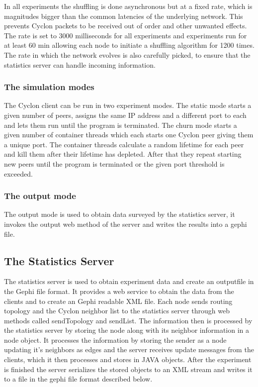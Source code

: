 In all experiments the shuffling is done asynchronous but at a fixed rate, which
is magnitudes bigger than the common latencies of the underlying network. This prevents Cyclon packets to
be received out of order and other unwanted effects. The rate is set to
3000 milliseconds for all experiments and experiments run for at least 60 min
allowing each node to initiate a shuffling algorithm for 1200 times. The rate in which
the network evolves is also carefully picked, to ensure that the statistics server can handle incoming information.

\subsubsection{The simulation modes}
The Cyclon client can be run in two experiment modes. The static mode starts a
given number of peers, assigns the same IP address and a different port to each
and lets them run until the program is terminated. The churn mode starts a
given number of container threads which each starts one Cyclon peer giving them
a unique port. The container threads calculate a random lifetime for each peer
and kill them after their lifetime has depleted. After that they repeat starting
new peers until the program is terminated or the given port threshold is
exceeded.
\subsubsection{The output mode}
The output mode is used to obtain data surveyed by the statistics server, it
invokes the output web method of the server and writes the results into a gephi
file.  
\subsection{The Statistics Server}

The statistics server is used to obtain experiment data and create an outputfile
in the Gephi file format. It provides a web service to obtain the data from the
clients and to create an Gephi readable XML file.  Each node sends routing
topology and the Cyclon neighbor list to the statistics server
through web methods called sendTopology and sendList. The information then is
processed by the statistics server by storing the node along with its neighbor
information in a node object.  It processes the information by storing the
sender as a node updating it's neighbors as edges and the server receives
update messages from the clients, which it then processes and stores in JAVA
objects. After the experiment is finished the server serializes the stored
objects to an XML stream and writes it to a file in the gephi file format described below.

